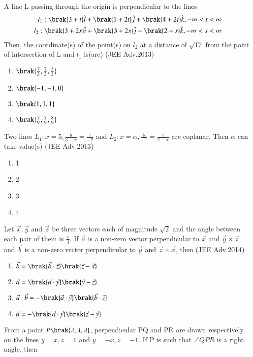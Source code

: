 	\item A line L passing through the origin is perpendicular to the lines
		\begin{align*}
			l_1 : \brak{3+t}\hat{i}+\brak{1+2t}\hat{j}+\brak{4+2t}\hat{k}, -\infty<t<\infty \\
			l_2 : \brak{3+2s}\hat{i}+\brak{3+2s}\hat{j}+\brak{2+s}\hat{k},-\infty<s<\infty 
		\end{align*}
		Then, the coordinate(s) of the point(s) on $l_2$ at a distance of $\sqrt{17}$ from the point of intersection of L and $l_1$ is(are) \hfill{(JEE Adv.2013)}
		\begin{enumerate}
			\item $\brak{\frac{7}{3},\frac{7}{3},\frac{5}{3}}$
			\item $\brak{-1,-1,0}$
			\item $\brak{1,1,1}$
			\item $\brak{\frac{7}{9},\frac{7}{9},\frac{8}{9}}$
		\end{enumerate}
	\item Two lines $L_1: x=5,\frac{y}{3-\alpha}=\frac{z}{-2}$ and $L_2: x=\alpha,\frac{y}{-1}=\frac{z}{2-\alpha}$ are coplanar. Then $\alpha$ can take value(s) \hfill{(JEE Adv.2013)}
		\begin{enumerate}
			\item 1
			\item 2 
			\item 3
			\item 4
		\end{enumerate}
	\item Let $\vec{x},\vec{y}$ and $\vec{z}$ be three vectors each of magnitude $\sqrt{2}$ and the angle between each pair of them is $\frac{\pi}{3}$. If $\vec{a}$ is a non-zero vector perpendicular
		to $\vec{x}$ and $\vec{y}\times \vec{z}$ and $\vec{b}$ is a non-zero vector perpendicular to $\vec{y}$ and $\vec{z}\times \vec{x}$, then \hfill{(JEE Adv.2014)}
		\begin{enumerate}
			\item $\vec{b}=\brak{\vec{b} \cdot \vec{z}}\brak{\vec{z}-\vec{x}}$
			\item $\vec{a}=\brak{\vec{a} \cdot \vec{y}}\brak{\vec{y}-\vec{z}}$
			\item $\vec{a}\cdot\vec{b}=-\brak{\vec{a} \cdot \vec{y}}\brak{\vec{b}\cdot\vec{z}}$
			\item $\vec{a}=-\brak{\vec{a} \cdot \vec{y}}\brak{\vec{z}-\vec{y}}$
		\end{enumerate}
	\item From a point $P\brak{\lambda,\lambda,\lambda}$, perpendicular PQ and PR are drawn respectively on the lines $y=x,z=1$ and $y=-x,z=-1$. If P is such that $\angle QPR$ is a right angle, then
